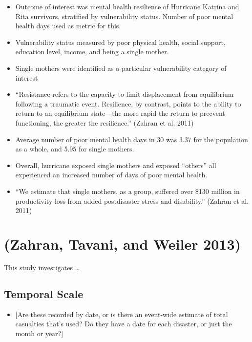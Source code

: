 \documentclass[
]{article}
\providecommand{\tightlist}{%
  \setlength{\itemsep}{0pt}\setlength{\parskip}{0pt}}
\begin{document}
\begin{itemize}
\tightlist
\item
  Outcome of interest was mental health resilience of Hurricane Katrina
  and Rita survivors, stratified by vulnerability status. Number of poor
  mental health days used as metric for this.
\item
  Vulnerability status measured by poor physical health, social support,
  education level, income, and being a single mother.
\item
  Single mothers were identified as a particular vulnerability category
  of interest
\item
  ``Resistance refers to the capacity to limit displacement from
  equilibrium following a traumatic event. Resilience, by contrast,
  points to the ability to return to an equilibrium state---the more
  rapid the return to preevent functioning, the greater the
  resilience.'' (Zahran et al. 2011)
\item
  Average number of poor mental health days in 30 was 3.37 for the
  population as a whole, and 5.95 for single mothers.
\item
  Overall, hurricane exposed single mothers and exposed ``others'' all
  experienced an increased number of days of poor mental health.
\item
  ``We estimate that single mothers, as a group, suffered over \$130
  million in productivity loss from added postdisaster stress and
  disability.'' (Zahran et al. 2011)
\end{itemize}

\hypertarget{zahran2013daily}{%
\section{(Zahran, Tavani, and Weiler 2013)}\label{zahran2013daily}}

This study investigates \ldots{}

\hypertarget{temporal-scale-18}{%
\subsection{Temporal Scale}\label{temporal-scale-18}}

\begin{itemize}
\tightlist
\item
  {[}Are these recorded by date, or is there an event-wide estimate of
  total casualties that's used? Do they have a date for each disaster,
  or just the month or year?{]}
\end{itemize}
\end{document}
